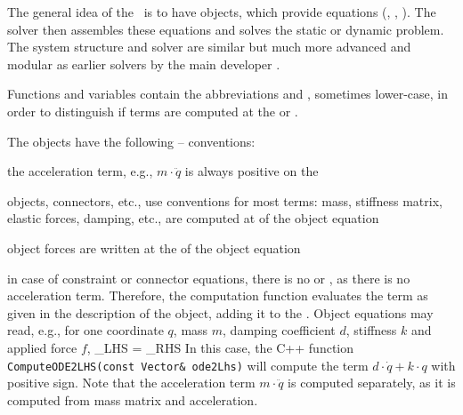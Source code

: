 %
The general idea of the \codeName\ is to have objects, which provide equations (, , ).
The solver then assembles these equations and solves the static or dynamic problem.
The system structure and solver are similar but much more advanced and modular as earlier solvers by the main developer \cite{GerstmayrStangl2004,Gerstmayr2009,GerstmayrEtAl2013}.

Functions and variables contain the abbreviations  and , sometimes lower-case, in order
to distinguish if terms are computed at the  or .

The objects have the following -- conventions:
\bi
  \item the acceleration term, e.g., $m \cdot \ddot q$ is always positive on the 
  \item objects, connectors, etc., use  conventions for most terms: mass, stiffness matrix, elastic forces, damping, etc., are computed at  of the object equation
  \item object forces are written at the  of the object equation
  \item in case of constraint or connector equations, there is no  or , as there is no acceleration term. 
\ei
Therefore, the computation function evaluates the term as given in the description of the object, adding it to the .
Object equations may read, e.g., for one coordinate $q$, mass $m$, damping coefficient $d$, stiffness $k$ and applied force $f$,
\be
  _{LHS} = _{RHS}
\ee 
In this case, the C++ function \texttt{ComputeODE2LHS(const Vector\& ode2Lhs)} will compute the term
$d \cdot \dot q + k \cdot q$ with positive sign. Note that the acceleration term $m \cdot \ddot q$ is computed separately, as it 
is computed from mass matrix and acceleration.

